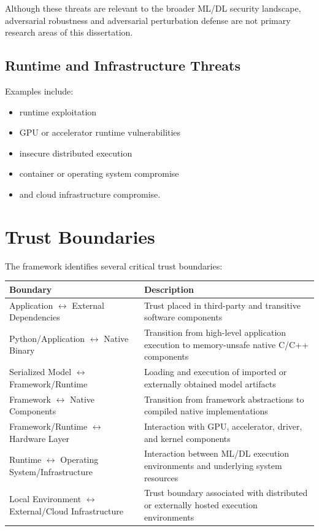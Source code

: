 \documentclass[
  12pt,
  letterpaper,
  oneside]{report}
\newcounter{none} %
\providecommand{\tightlist}{%
  \setlength{\itemsep}{0pt}\setlength{\parskip}{0pt}}
\begin{document}
Although these threats are relevant to the broader ML/DL security
landscape, adversarial robustness and adversarial perturbation defense
are not primary research areas of this dissertation.

\subsection{Runtime and Infrastructure Threats}\label{656-runtime-and-infrastructure-threats}

Examples include:

\begin{itemize}
\tightlist
\item
  runtime exploitation
\item
  GPU or accelerator runtime vulnerabilities
\item
  insecure distributed execution
\item
  container or operating system compromise
\item
  and cloud infrastructure compromise.
\end{itemize}

\section{Trust Boundaries}\label{66-trust-boundaries}

The framework identifies several critical trust boundaries:

{\def\LTcaptype{none} %
\begin{longtable}[]{@{}>{\raggedright\arraybackslash}p{}>{\raggedright\arraybackslash}p{}@{}}
\toprule\noalign{}
\textbf{Boundary} & \textbf{Description} \\
\midrule\noalign{}
\endhead
\bottomrule\noalign{}
\endlastfoot
Application \(\leftrightarrow\) External Dependencies & Trust placed in third-party and
transitive software components \\
\midrule
Python/Application \(\leftrightarrow\) Native Binary & Transition from high-level
application execution to memory-unsafe native C/C++ components \\
\midrule
Serialized Model \(\leftrightarrow\) Framework/Runtime & Loading and execution of imported
or externally obtained model artifacts \\
\midrule
Framework \(\leftrightarrow\) Native Components & Transition from framework abstractions
to compiled native implementations \\
\midrule
Framework/Runtime \(\leftrightarrow\) Hardware Layer & Interaction with GPU, accelerator,
driver, and kernel components \\
\midrule
Runtime \(\leftrightarrow\) Operating System/Infrastructure & Interaction between ML/DL
execution environments and underlying system resources \\
\midrule
Local Environment \(\leftrightarrow\) External/Cloud Infrastructure & Trust boundary
associated with distributed or externally hosted execution
environments \\
\end{longtable}
}
\end{document}
